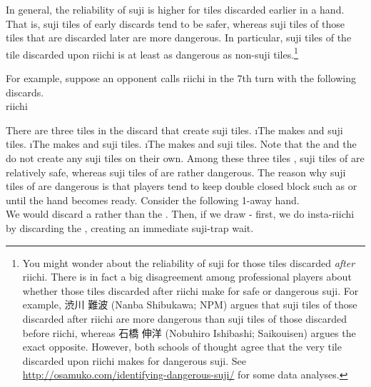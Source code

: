 {{\bigskip
In general, the reliability of {\jap suji} is higher for tiles discarded earlier in a hand. That is, {\jap suji} tiles of early discards tend to be safer, whereas {\jap suji} tiles of those tiles that are discarded later are more dangerous. In particular, {\jap suji} tiles of the tile discarded upon {\jap riichi} is at least as dangerous as non-{\jap suji} tiles.\footnote{You might wonder about the reliability of {\jap suji} for those tiles discarded \emph{after} {\jap riichi}. There is in fact a big disagreement among professional players about whether those tiles discarded after {\jap riichi} make for safe or dangerous {\jap suji}. For example, 渋川 難波 (Nanba Shibukawa; NPM) argues that {\jap suji} tiles of those discarded after {\jap riichi} are more dangerous than {\jap suji} tiles of those discarded before {\jap riichi}, whereas 石橋 伸洋 (Nobuhiro Ishibashi; {\jap Saikouisen}) argues the exact opposite. However, both schools of thought agree that the very tile discarded upon {\jap riichi} makes for dangerous {\jap suji}. See \url{http://osamuko.com/identifying-dangerous-suji/} for some data analyses.} 

\bigskip
For example, suppose an opponent calls {\jap riichi} in the 7th turn with the following discards.
\bp
\bei\fa{}\\
\hspace{130pt}\footnotesize{{\jap riichi}}
\ep

\newpage
There are three tiles in the discard that create {\jap suji} tiles.
\bi
\i The {\large{}} makes {\large{}} and {\large{}} {\jap suji} tiles.
\i The {\large{}} makes {\large{}} and {\large{}} {\jap suji} tiles.
\i The {\large{}} makes {\large{}} and {\large{}} {\jap suji} tiles.
\ei
Note that the {\large{}} and the {\large{}} do not create any {\jap suji} tiles on their own. Among these three tiles {\large{}}, {\jap suji} tiles of {\large{}} are relatively safe, whereas {\jap suji} tiles of {\large{}} are rather dangerous. 
The reason why {\jap suji} tiles of {\large{}} are dangerous is that players tend to keep double closed block such as {\large{}} or {\large{}} until the hand becomes ready. Consider the following 1-away hand. 
\bp
{}\\ \vspace{-18pt}
\rfd{}
\ep
We would discard a {\large{}} rather than the {\large{}}.
Then, if we draw {\large{}-} first, we do insta-{\jap riichi} by discarding the {\large{}}, creating an immediate {\jap suji}-trap wait. 


}}
